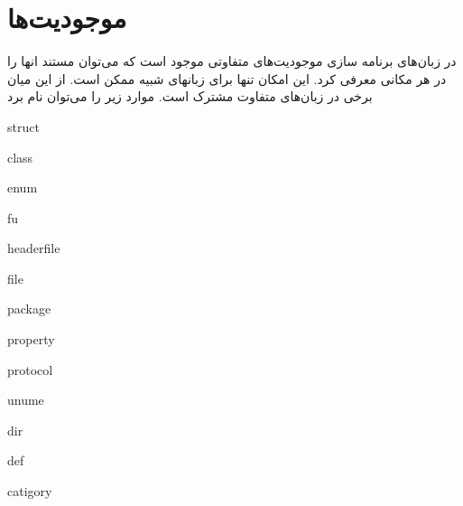 %
% 
% 
% 
%
\section{موجودیت‌ها}

در زبان‌های برنامه سازی موجودیت‌های متفاوتی موجود است که می‌توان مستند انها را
در هر مکانی معرفی کرد. این امکان تنها برای زبانهای شبیه  ممکن است. از
این میان برخی در زبان‌های متفاوت مشترک است. موارد زیر را می‌توان نام برد


struct

class

enum

fu

headerfile

file

package

property

protocol

unume

dir

def

catigory


